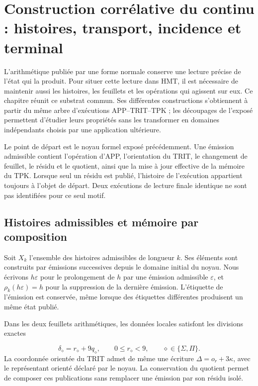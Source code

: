 \section{Construction corrélative du continu : histoires, transport, incidence et terminal}
\label{x_reciprocidad:iv:continuo-conjunto}
L'arithmétique publiée par une forme normale conserve une lecture précise de l'état qui la produit. Pour situer cette lecture dans HMT, il est nécessaire de maintenir aussi les histoires, les feuillets et les opérations qui agissent sur eux. Ce chapitre réunit ce substrat commun. Ses différentes constructions s'obtiennent à partir du même arbre d'exécutions APP–TRIT–TPK ; les découpages de l'exposé permettent d'étudier leurs propriétés sans les transformer en domaines indépendants choisis par une application ultérieure.

Le point de départ est le noyau formel exposé précédemment. Une émission admissible contient l'opération d'APP, l'orientation du TRIT, le changement de feuillet, le résidu et le quotient, ainsi que la mise à jour effective de la mémoire du TPK. Lorsque seul un résidu est publié, l'histoire de l'exécution appartient toujours à l'objet de départ. Deux exécutions de lecture finale identique ne sont pas identifiées pour ce seul motif.

\subsection{Histoires admissibles et mémoire par composition}
\label{x_reciprocidad:iv:cont:historias}
Soit \(X_k\) l'ensemble des histoires admissibles de longueur \(k\). Ses éléments sont construits par émissions successives depuis le domaine initial du noyau. Nous écrivons \(h\varepsilon\) pour le prolongement de \(h\) par une émission admissible \(\varepsilon\), et \(\rho_k(h\varepsilon)=h\) pour la suppression de la dernière émission. L'étiquette de l'émission est conservée, même lorsque des étiquettes différentes produisent un même état publié.

Dans les deux feuillets arithmétiques, les données locales satisfont les divisions exactes

\[
\delta_\diamond=r_\diamond+9q_\diamond,
\qquad 0\leq r_\diamond<9,
\qquad \diamond\in\{\Sigma,\Pi\}.
\]
La coordonnée orientée du TRIT admet de même une écriture \(\Delta=o_r+3\kappa\), avec le représentant orienté déclaré par le noyau. La conservation du quotient permet de composer ces publications sans remplacer une émission par son résidu isolé.

